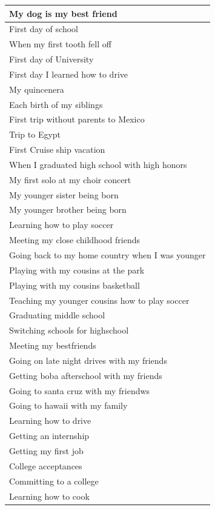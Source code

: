 \documentclass[
  .7em,
  letterpaper,
  DIV=11,
  numbers=noendperiod]{scrartcl}
\begin{document}
\begin{table}
\begin{tabular}{l}
\hline
My dog is my best friend\\
\hline
First day of school\\
\hline
When my first tooth fell off\\
\hline
First day of University\\
\hline
First day I learned how to drive\\
\hline
My quincenera\\
\hline
Each birth of my siblings\\
\hline
First trip without parents to Mexico\\
\hline
Trip to Egypt\\
\hline
First Cruise ship vacation\\
\hline
When I graduated high school with high honors\\
\hline
My first solo at my choir concert\\
\hline
My younger sister being born\\
\hline
My younger brother being born\\
\hline
Learning how to play soccer\\
\hline
Meeting my close childhood friends\\
\hline
Going back to my home country when I was younger\\
\hline
Playing with my cousins at the park\\
\hline
Playing with my cousins basketball\\
\hline
Teaching my younger cousins how to play soccer\\
\hline
Graduating middle school\\
\hline
Switching schools for highschool\\
\hline
Meeting my bestfriends\\
\hline
Going on late night drives with my friends\\
\hline
Getting boba afterschool with my friends\\
\hline
Going to santa cruz with my friendws\\
\hline
Going to hawaii with my family\\
\hline
Learning how to drive\\
\hline
Getting an internship\\
\hline
Getting my first job\\
\hline
College acceptances\\
\hline
Committing to a college\\
\hline
Learning how to cook\\
\hline

\end{tabular}
\end{table}
\end{document}
